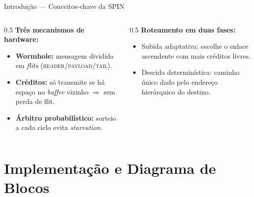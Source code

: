 \documentclass[aspectratio=169]{beamer}
\begin{document}
\begin{frame}{Introdução --- Conceitos-chave da SPIN}
  \begin{columns}[T]
    \begin{column}{0.5\textwidth}
      \textbf{Três mecanismos de hardware:}
      \begin{itemize}
        \item \textbf{Wormhole:} mensagem dividida em \emph{flits}
        (\textsc{header}/\textsc{payload}/\textsc{tail}).
        \item \textbf{Créditos:} só transmite se há espaço no \emph{buffer}
        vizinho $\Rightarrow$ sem perda de flit.
        \item \textbf{Árbitro probabilístico:} sorteio a cada ciclo evita
        \emph{starvation}.
      \end{itemize}
    \end{column}
    \begin{column}{0.5\textwidth}
      \textbf{Roteamento em duas fases:}
      \begin{itemize}
        \item \alert{Subida adaptativa:} escolhe o enlace ascendente com mais
        créditos livres.
        \item \alert{Descida determinística:} caminho único dado pelo endereço
        hierárquico do destino.
      \end{itemize}
    \end{column}
  \end{columns}
\end{frame}

\section{Implementação e Diagrama de Blocos}
\end{document}

